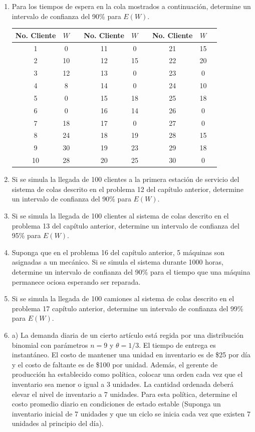 \documentclass[11pt,letterpaper]{report}
\begin{document}
\begin{enumerate}
\item[6.5.] Para los tiempos de espera en la cola mostrados a
continuación, determine un intervalo de confianza del 90\% para
$E(W)$.

\begin{table}[H]
\centering
\begin{tabular}{ccc ccc ccc}
\toprule
No. Cliente & $W$ & & No. Cliente & $W$ & & No. Cliente & $W$ & \\
\midrule
1 & 0 & & 11 & 0 & & 21 & 15 & \\
2 & 10 & & 12 & 15 & & 22 & 20 & \\
3 & 12 & & 13 & 0 & & 23 & 0 & \\
4 & 8 & & 14 & 0 & & 24 & 10 & \\
5 & 0 & & 15 & 18 & & 25 & 18 & \\
6 & 0 & & 16 & 14 & & 26 & 0 & \\
7 & 18 & & 17 & 0 & & 27 & 0 & \\
8 & 24 & & 18 & 19 & & 28 & 15 & \\
9 & 30 & & 19 & 23 & & 29 & 18 & \\
10 & 28 & & 20 & 25 & & 30 & 0 & \\
\bottomrule
\end{tabular}
\end{table}

\item[6.6.] Si se simula la llegada de 100 clientes a la primera
estación de servicio del sistema de colas descrito en el problema 12
del capítulo anterior, determine un intervalo de confianza del 90\%
para $E(W)$.

\item[6.7.] Si se simula la llegada de 100 clientes al sistema de colas
descrito en el problema 13 del capítulo anterior, determine un
intervalo de confianza del 95\% para $E(W)$.

\item[6.8.] Suponga que en el problema 16 del capítulo anterior, 5
máquinas son asignadas a un mecánico. Si se simula el sistema durante
1000 horas, determine un intervalo de confianza del 90\% para el tiempo
que una máquina permanece ociosa esperando ser reparada.

\item[6.9.] Si se simula la llegada de 100 camiones al sistema de colas
descrito en el problema 17 capítulo anterior, determine un intervalo de
confianza del 99\% para $E(W)$.

\item[6.10.] a) La demanda diaria de un cierto artículo está regida por
una distribución binomial con parámetros $n=9$ y $\theta=1/3$. El
tiempo de entrega es instantáneo. El costo de mantener una unidad en
inventario es de \$25 por día y el costo de faltante es de \$100 por
unidad. Además, el gerente de producción ha establecido como política,
colocar una orden cada vez que el inventario sea menor o igual a 3
unidades. La cantidad ordenada deberá elevar el nivel de inventario a 7
unidades. Para esta política, determine el costo promedio diario en
condiciones de estado estable (Suponga un inventario inicial de 7
unidades y que un ciclo se inicia cada vez que existen 7 unidades al
principio del día).


\end{enumerate}
\end{document}
